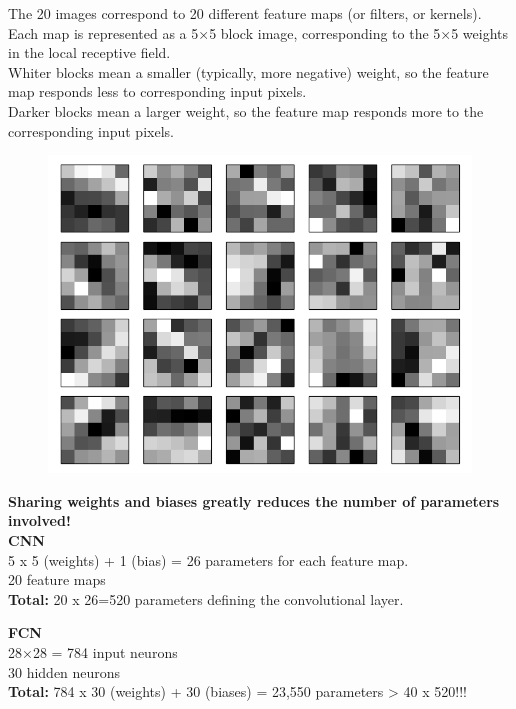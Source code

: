 \documentclass[10pt, compress]{beamer}
\begin{document}
\begin{frame}
  \vspace{0.6cm}
  The 20 images correspond to 20 different feature maps (or filters, or kernels).\\
  Each map is represented as a 5×5 block image, corresponding to the 5×5 weights in the local receptive field.\\
  Whiter blocks mean a smaller (typically, more negative) weight, so the feature map responds less to corresponding input pixels. \\
  Darker blocks mean a larger weight, so the feature map responds more to the corresponding input pixels.
  \begin{figure}
    \includegraphics[width=.6\linewidth]{imgs/cnn/kernels_1}
  \end{figure}
\end{frame}

\begin{frame}
  \vspace{0.6cm}
  \textbf{Sharing weights and biases greatly reduces the number of parameters involved!} \\ \hfill \break
  \textbf{CNN} \\
  5 x 5 (weights) + 1 (bias) = 26 parameters for each feature map. \\
  20 feature maps\\
  \textbf{Total:} 20 x 26=520 parameters defining the convolutional layer. \\ \hfill \break

  \textbf{FCN} \\
  28×28 = 784 input neurons \\
  30 hidden neurons \\
  \textbf{Total:} 784 x 30 (weights) + 30 (biases) = 23,550 parameters > 40 x 520!!!

\end{frame}
\end{document}
